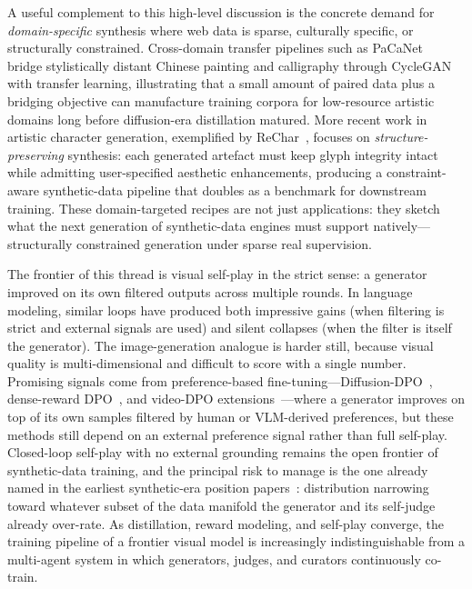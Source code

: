\documentclass{llmxive}
\begin{document}
A useful complement to this high-level discussion is the concrete demand for \emph{domain-specific} synthesis where web data is sparse, culturally specific, or structurally constrained. Cross-domain transfer pipelines such as PaCaNet~\citep{PaCaNet} bridge stylistically distant Chinese painting and calligraphy through CycleGAN with transfer learning, illustrating that a small amount of paired data plus a bridging objective can manufacture training corpora for low-resource artistic domains long before diffusion-era distillation matured. More recent work in artistic character generation, exemplified by ReChar~\citep{Rechar}, focuses on \emph{structure-preserving} synthesis: each generated artefact must keep glyph integrity intact while admitting user-specified aesthetic enhancements, producing a constraint-aware synthetic-data pipeline that doubles as a benchmark for downstream training. These domain-targeted recipes are not just applications: they sketch what the next generation of synthetic-data engines must support natively---structurally constrained generation under sparse real supervision.

The frontier of this thread is visual self-play in the strict sense: a generator improved on its own filtered outputs across multiple rounds. In language modeling, similar loops have produced both impressive gains (when filtering is strict and external signals are used) and silent collapses (when the filter is itself the generator). The image-generation analogue is harder still, because visual quality is multi-dimensional and difficult to score with a single number. Promising signals come from preference-based fine-tuning---Diffusion-DPO~\citep{wallace2024diffusion}, dense-reward DPO~\citep{yang2024dense}, and video-DPO extensions~\citep{liu2025videodpo}---where a generator improves on top of its own samples filtered by human or VLM-derived preferences, but these methods still depend on an external preference signal rather than full self-play. Closed-loop self-play with no external grounding remains the open frontier of synthetic-data training, and the principal risk to manage is the one already named in the earliest synthetic-era position papers~\citep{yang2023aigs}: distribution narrowing toward whatever subset of the data manifold the generator and its self-judge already over-rate. As distillation, reward modeling, and self-play converge, the training pipeline of a frontier visual model is increasingly indistinguishable from a multi-agent system in which generators, judges, and curators continuously co-train.
\end{document}
